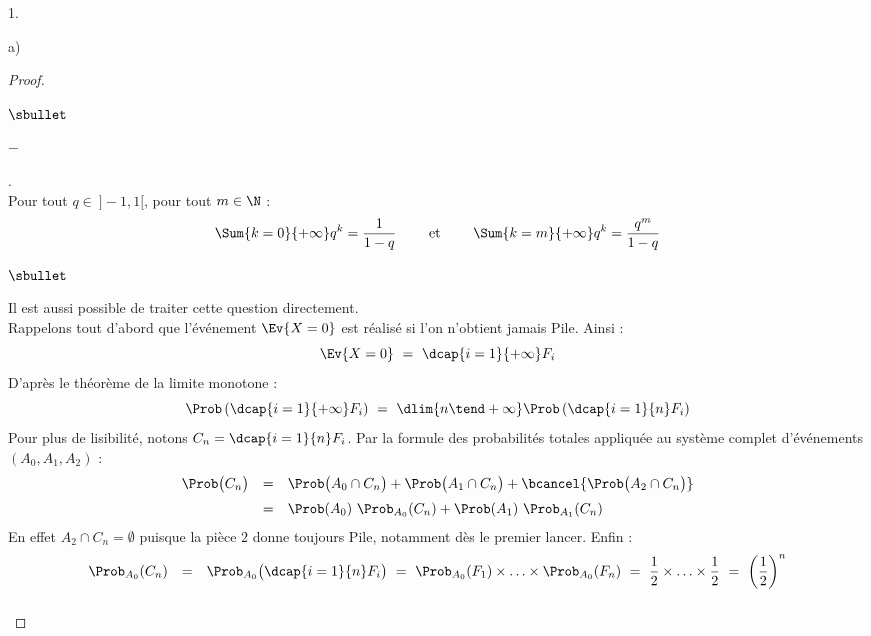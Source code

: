 \begin{noliste}{1.}
\begin{noliste}{a)}
\begin{proof}
\begin{remarkL}{.98}
\begin{noliste}{$\sbullet$}
\begin{noliste}{$-$}
          \item {}.\\
            Pour tout $q \in \ ]-1, 1[$, pour tout $m \in \N$ :
            \[
            \Sum{k = 0}{+\infty} q^k = \dfrac{1}{1-q}%
            \qquad \text{ et } \qquad %
            \Sum{k = m}{+\infty} q^k = \dfrac{q^m}{1-q}
            \]
          \end{noliste}          
        \end{noliste}
      \end{remarkL}


      \newpage


      \begin{remarkL}{.98}%
        \begin{noliste}{$\sbullet$}
        \item Il est aussi possible de traiter cette question
          directement.\\
          Rappelons tout d'abord que l'événement $\Ev{X = 0}$ est
          réalisé si l'on n'obtient jamais Pile. Ainsi :
          \[
          \Ev{X = 0} \ = \ \dcap{i=1}{+\infty} F_i
          \]
          D'après le théorème de la limite monotone :
          \[
          \Prob\left(\dcap{i=1}{+\infty} F_i \right) \ = \ \dlim{n
            \tend +\infty} \Prob\left(\dcap{i=1}{n} F_i \right)
          \]
          Pour plus de lisibilité, notons $C_n = \dcap{i=1}{n} F_i$.
          Par la formule des probabilités totales appliquée au système
          complet d'événements $(A_0, A_1, A_2)$ :
          \[
          \begin{array}{rcl}
            \Prob\big( C_n \big) & = & \Prob\big( A_0 \cap C_n \big) +
            \Prob\big( A_1 \cap C_n \big) + \bcancel{\Prob\big( A_2 \cap
              C_n \big)}
            \\[.2cm]
            & = & \Prob(A_0) \ \Prob_{A_0}(C_n) + \Prob(A_1) \
            \Prob_{A_1}(C_n) 
          \end{array}
          \]
          En effet $A_2 \cap C_n = \emptyset$ puisque la pièce $2$
          donne toujours Pile, notamment dès le premier lancer. Enfin
          :
          \[
          \begin{array}{rcl}
            \Prob_{A_0}( C_n ) & = & \Prob_{A_0}\big( \dcap{i=1}{n} F_i
            \big) \ = \ \Prob_{A_0}(F_1) \times \ldots \times \Prob_{A_0}(F_n)
            \ = \ \dfrac{1}{2} \times \ldots \times \dfrac{1}{2} \ = \
            \left( \dfrac{1}{2} \right)^n
            \\[.4cm]

\end{array}\]
\end{noliste}
\end{remarkL}
\end{proof}
\end{noliste}
\end{noliste}
